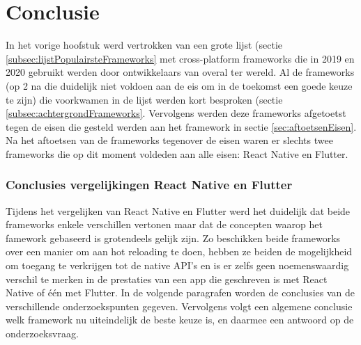 
\chapter{Conclusie}
\label{ch:conclusie}



In het vorige hoofstuk werd vertrokken van een grote lijst (sectie \ref{subsec:lijstPopulairsteFrameworks} met cross-platform frameworks die in 2019 en 2020 gebruikt werden door ontwikkelaars van overal ter wereld. Al de frameworks (op 2 na die duidelijk niet voldoen aan de eis om in de toekomst een goede keuze te zijn) die voorkwamen in de lijst werden kort besproken (sectie \ref{subsec:achtergrondFrameworks}. Vervolgens werden deze frameworks afgetoetst tegen de eisen die gesteld werden aan het framework in sectie \ref{sec:aftoetsenEisen}. Na het aftoetsen van de frameworks tegenover de eisen waren er slechts twee frameworks die op dit moment voldeden aan alle eisen: React Native en Flutter.

\subsection{Conclusies vergelijkingen React Native en Flutter}
\label{subsec:conclusieVgl}

Tijdens het vergelijken van React Native en Flutter werd het duidelijk dat beide frameworks enkele verschillen vertonen maar dat de concepten waarop het famework gebaseerd is grotendeels gelijk zijn. Zo beschikken beide frameworks over een manier om aan hot reloading te doen, hebben ze beiden de mogelijkheid om toegang te verkrijgen tot de native API's en is er zelfs geen noemenswaardig verschil te merken in de prestaties van een app die geschreven is met React Native of één met Flutter. In de volgende paragrafen worden de conclusies van de verschillende onderzoekspunten gegeven. Vervolgens volgt een algemene conclusie welk framework nu uiteindelijk de beste keuze is, en daarmee een antwoord op de onderzoeksvraag.

